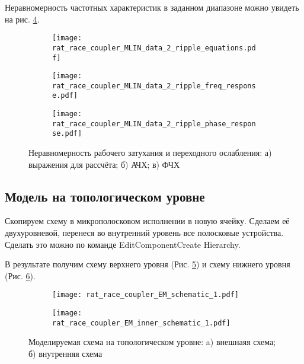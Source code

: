 Неравномерность частотных характеристик в заданном диапазоне можно увидеть на рис. \ref{fig:rat_race_coupler_MLIN_data_2_response_ripple}.

\begin{figure}[!ht]
    \centering
    \begin{subfigure}[b]{0.4\textwidth}
        \centering
        \texttt{[image: rat\_race\_coupler\_MLIN\_data\_2\_ripple\_equations.pdf]}
        \caption{}
        \label{fig:rat_race_coupler_MLIN_data_2_ripple_equations}
    \end{subfigure}
    \vfill
    \begin{subfigure}[b]{0.40\textwidth}
        \centering
        \texttt{[image: rat\_race\_coupler\_MLIN\_data\_2\_ripple\_freq\_response.pdf]}
        \caption{}
        \label{fig:rat_race_coupler_MLIN_data_2_ripple_freq_response}
    \end{subfigure}
    \hfill
    \begin{subfigure}[b]{0.50\textwidth}
        \centering
        \texttt{[image: rat\_race\_coupler\_MLIN\_data\_2\_ripple\_phase\_response.pdf]}
        \caption{}
        \label{fig:rat_race_coupler_MLIN_data_2_ripple_phase_response}
    \end{subfigure}
    \caption{
        Неравномерность рабочего затухания и переходного ослабления:
        а) выражения для рассчёта;
        б) АЧХ;
        в) ФЧХ
    }
    \label{fig:rat_race_coupler_MLIN_data_2_response_ripple}
\end{figure}

\subsection{Модель на топологическом уровне}

Скопируем схему в микрополосковом исполнении в новую ячейку. Сделаем её двухуровневой, перенеся во внутренний уровень все полосковые устройства. Сделать это можно по команде Edit\textrightarrow Component\textrightarrow Create Hierarchy.

В результате получим схему верхнего уровня (Рис. \ref{fig:rat_race_coupler_EM_schematic}) и схему нижнего уровня (Рис. \ref{fig:rat_race_coupler_EM_inner_schematic}).

\begin{figure}[!ht]
    \centering
    \begin{subfigure}[b]{0.45\textwidth}
        \centering
        \texttt{[image: rat\_race\_coupler\_EM\_schematic\_1.pdf]}
        \caption{}
        \label{fig:rat_race_coupler_EM_schematic}
    \end{subfigure}
    \hfill
    \begin{subfigure}[b]{0.45\textwidth}
        \centering
        \texttt{[image: rat\_race\_coupler\_EM\_inner\_schematic\_1.pdf]}
        \caption{}
        \label{fig:rat_race_coupler_EM_inner_schematic}
    \end{subfigure}
    \caption{
        Моделируемая схема на топологическом уровне:
        a) внешнаяя схема;
        б) внутренняя схема
    }
    \label{fig:rat_race_coupler_EM_schematics}
\end{figure}

